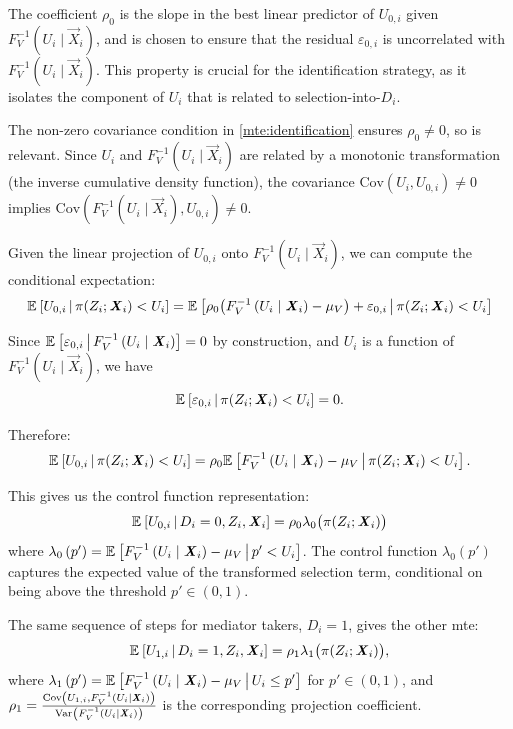 The coefficient $\rho_0$ is the slope in the best linear predictor of $U_{0,i}$ given $F_V^{-1}\left( U_i \mid \vec{X}_i \right)$, and is chosen to ensure that the residual $\varepsilon_{0,i}$ is uncorrelated with $F_V^{-1}\left( U_i \mid \vec{X}_i \right)$.
This property is crucial for the identification strategy, as it isolates the component of $U_{i}$ that is related to selection-into-$D_i$.

The non-zero covariance condition in \ref{mte:identification} ensures $\rho_0 \neq 0$, so is relevant.
Since $U_i$ and $F_V^{-1}\left( U_i \mid \vec{X}_i \right)$ are related by a monotonic transformation (the inverse cumulative density function), the covariance $\text{Cov}(U_i, U_{0,i}) \neq 0$ implies $\text{Cov}(F_V^{-1}\left( U_i \mid \vec{X}_i \right), U_{0,i}) \neq 0$.

Given the linear projection of $U_{0,i}$ onto $F_V^{-1}\left( U_i \mid \vec{X}_i \right)$, we can compute the conditional expectation:
\[ \mathbb{E}_{} \left[ U_{0,i} \, \middle\vert \, \pi(Z_i; \boldsymbol{\mathit{X}}_i) < U_i \right] = \mathbb{E}_{} \left[ \rho_0\big(F_V^{-1}\left( U_i \mid \boldsymbol{\mathit{X}}_i \right) - \mu_V\big) + \varepsilon_{0,i} \, \middle\vert \, \pi(Z_i; \boldsymbol{\mathit{X}}_i) < U_i \right] \]

Since $\mathbb{E}_{} \left[ \varepsilon_{0,i} \, \middle\vert \, F_V^{-1}\left( U_i \mid \boldsymbol{\mathit{X}}_i \right) \right] = 0$ by construction, and $U_i$ is a function of $F_V^{-1}\left( U_i \mid \vec{X}_i \right)$, we have
\[ \mathbb{E}_{} \left[ \varepsilon_{0,i} \, \middle\vert \, \pi(Z_i; \boldsymbol{\mathit{X}}_i) < U_i \right] = 0. \]

Therefore:
\[ \mathbb{E}_{} \left[ U_{0,i} \, \middle\vert \, \pi(Z_i; \boldsymbol{\mathit{X}}_i) < U_i \right] = \rho_0 \mathbb{E}_{} \left[ F_V^{-1}\left( U_i \mid \boldsymbol{\mathit{X}}_i \right) - \mu_V \, \middle\vert \, \pi(Z_i; \boldsymbol{\mathit{X}}_i) < U_i \right]. \]

This gives us the control function representation:
\[ \mathbb{E}_{} \left[ U_{0,i} \, \middle\vert \, D_i=0, Z_i, \boldsymbol{\mathit{X}}_i \right] = \rho_0 \lambda_0\big(\pi(Z_i; \boldsymbol{\mathit{X}}_i)\big) \]
where $\lambda_0 \left(p'\right) = \mathbb{E}_{} \left[ F_V^{-1}\left( U_i \mid \boldsymbol{\mathit{X}}_i \right) - \mu_V \, \middle\vert \, p' < U_i \right]$.
The control function $\lambda_0\left(p'\right)$ captures the expected value of the transformed selection term, conditional on being above the threshold $p' \in (0,1)$.

The same sequence of steps for mediator takers, $D_i = 1$, gives the other mte:
\[ \mathbb{E}_{} \left[ U_{1,i} \, \middle\vert \, D_i=1, Z_i, \boldsymbol{\mathit{X}}_i \right] = \rho_1 \lambda_1\big(\pi(Z_i; \boldsymbol{\mathit{X}}_i)\big), \]
where $\lambda_1 \left(p'\right) = \mathbb{E}_{} \left[ F_V^{-1}\left( U_i \mid \boldsymbol{\mathit{X}}_i \right) - \mu_V \, \middle\vert \, U_i \leq p' \right]$ for $p' \in (0,1)$, and $\rho_1 = \frac{\text{Cov} \left( U_{1,i}, F_V^{-1}\left( U_i \mid \boldsymbol{\mathit{X}}_i \right) \right)}{\text{Var}_{} \left( F_V^{-1}\left( U_i \mid \boldsymbol{\mathit{X}}_i \right) \right)}$ is the corresponding projection coefficient.

